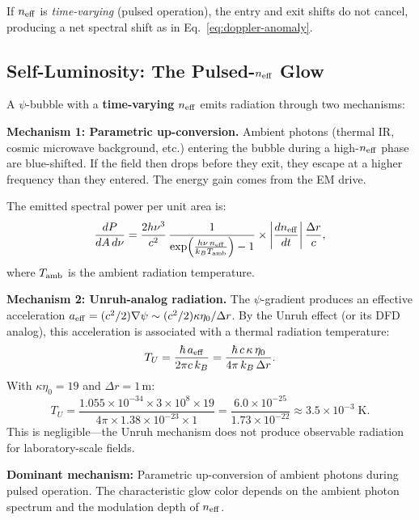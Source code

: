 \documentclass[11pt]{article}
\newcommand{\neff}{n_{\rm eff}}
\begin{document}
If $\neff$ is \emph{time-varying} (pulsed operation), the entry and exit
shifts do not cancel, producing a net spectral shift as in
Eq.~\eqref{eq:doppler-anomaly}.

\subsection{Self-Luminosity: The Pulsed-$\neff$ Glow}

\begin{tcolorbox}[colback=green!5,colframe=green!50!black,title=Luminosity Prediction]
A $\psi$-bubble with a \textbf{time-varying} $\neff$ emits radiation
through two mechanisms:

\textbf{Mechanism 1: Parametric up-conversion.}
Ambient photons (thermal IR, cosmic microwave background, etc.) entering
the bubble during a high-$\neff$ phase are blue-shifted. If the field
then drops before they exit, they escape at a higher frequency than they
entered. The energy gain comes from the EM drive.

The emitted spectral power per unit area is:
\begin{equation}\label{eq:luminosity}
\frac{dP}{dA\,d\nu} = \frac{2h\nu^3}{c^2}\,
  \frac{1}{\exp\!\left(\frac{h\nu\,\neff}{k_B T_{\rm amb}}\right) - 1}
  \times \left|\frac{d\neff}{dt}\right|\frac{\Delta r}{c},
\end{equation}
where $T_{\rm amb}$ is the ambient radiation temperature.

\textbf{Mechanism 2: Unruh-analog radiation.}
The $\psi$-gradient produces an effective acceleration
$a_{\rm eff} = (c^2/2)\nabla\psi \sim (c^2/2)\kappa\eta_0/\Delta r$.
By the Unruh effect (or its DFD analog), this acceleration is associated
with a thermal radiation temperature:
\begin{equation}\label{eq:unruh}
T_U = \frac{\hbar\,a_{\rm eff}}{2\pi c\,k_B}
  = \frac{\hbar\,c\,\kappa\,\eta_0}{4\pi\,k_B\,\Delta r}.
\end{equation}
With $\kappa\eta_0 = 19$ and $\Delta r = 1$\,m:
\begin{equation}
T_U = \frac{1.055 \times 10^{-34} \times 3 \times 10^8 \times 19}
  {4\pi \times 1.38 \times 10^{-23} \times 1}
  = \frac{6.0 \times 10^{-25}}{1.73 \times 10^{-22}}
  \approx 3.5 \times 10^{-3}\;\text{K}.
\end{equation}
This is negligible---the Unruh mechanism does not produce observable
radiation for laboratory-scale fields.

\textbf{Dominant mechanism:} Parametric up-conversion of ambient photons
during pulsed operation. The characteristic glow color depends on the
ambient photon spectrum and the modulation depth of $\neff$.
\end{tcolorbox}
\end{document}
